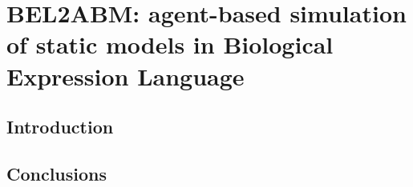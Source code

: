 \chapter{BEL2ABM: agent-based simulation of static models in Biological Expression Language}\label{chap:bel2abm}

\section*{Introduction}

\vspace*{\fill}



\section*{Conclusions}
